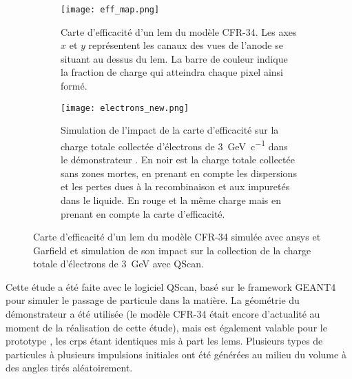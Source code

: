       \begin{figure}[htpb]
        \begin{subfigure}{0.48\textwidth}
          \centering
          \texttt{[image: eff\_map.png]}
          \caption{\label{fig::eff_map}Carte d'efficacité d'un \gls{lem} du modèle CFR-34. Les axes $x$ et $y$ représentent les  canaux des vues de l'anode se situant au dessus du \gls{lem}. La barre de couleur indique la fraction de charge qui atteindra chaque pixel ainsi formé.}
        \end{subfigure}
        \hfill
        \begin{subfigure}{0.48\textwidth}
          \centering
          \texttt{[image: electrons\_new.png]}
          \caption{\label{fig::electron}Simulation de l'impact de la carte d'efficacité sur la charge totale collectée d'électrons de \SI{3}{\giga\eV\per c} dans le démonstrateur \SSS{}. En noir est la charge totale collectée sans zones mortes, en prenant en compte les dispersions et les pertes dues à la recombinaison et aux impuretés dans le liquide. En rouge et la même charge mais en prenant en compte la carte d'efficacité.}
        \end{subfigure}
          \caption[Carte d'efficacité d'un LEM du modèle CFR-34 et impact sur la collection de charge]{Carte d'efficacité d'un \gls{lem} du modèle CFR-34 simulée avec \gls{ansys} et Garfield et simulation de son impact sur la collection de la charge totale d'électrons de \SI{3}{\giga\eV} avec QScan.}
      \end{figure}
        
      Cette étude a été faite avec le logiciel QScan, basé sur le framework GEANT4 pour simuler le passage de particule dans la matière. La géométrie du démonstrateur \SSS{} a été utilisée (le modèle CFR-34 était encore d'actualité au moment de la réalisation de cette étude), mais est également valable pour le prototype \TOO{}, les \glspl{crp} étant identiques mis à part les \glspl{lem}. Plusieurs types de particules à plusieurs impulsions initiales ont été générées au milieu du volume à des angles tirés aléatoirement.
            
